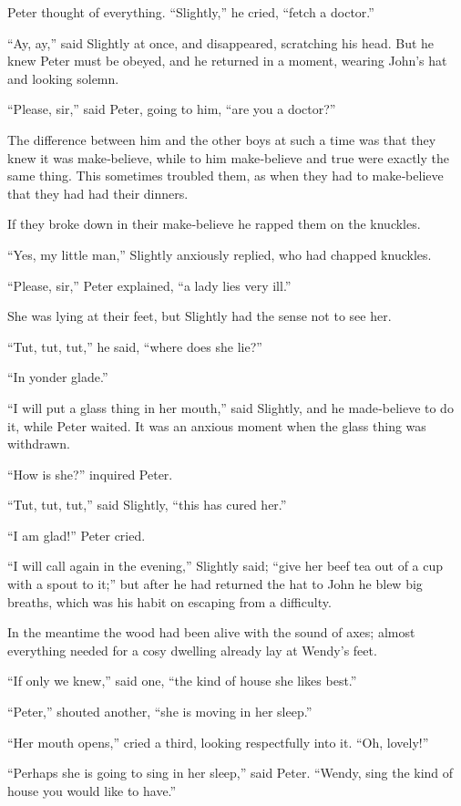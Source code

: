 Peter thought of everything.
“Slightly,” he cried, “fetch a doctor.”

“Ay, ay,” said Slightly at once, and disappeared, scratching his head.
But he knew Peter must be obeyed, and he returned in a moment, wearing John’s hat and looking solemn.

“Please, sir,” said Peter, going to him, “are you a doctor?”

The difference between him and the other boys at such a time was that they knew it was make‐believe,
while to him make‐believe and true were exactly the same thing.
This sometimes troubled them, as when they had to make‐believe that they had had their dinners.

If they broke down in their make‐believe he rapped them on the knuckles.

“Yes, my little man,” Slightly anxiously replied, who had chapped knuckles.

“Please, sir,” Peter explained, “a lady lies very ill.”

She was lying at their feet, but Slightly had the sense not to see her.

“Tut, tut, tut,” he said, “where does she lie?”

“In yonder glade.”

“I will put a glass thing in her mouth,” said Slightly,
and he made‐believe to do it, while Peter waited.
It was an anxious moment when the glass thing was withdrawn.

“How is she?\@” inquired Peter.

“Tut, tut, tut,” said Slightly, “this has cured her.”

“I am glad!\@” Peter cried.

“I will call again in the evening,” Slightly said;
“give her beef tea out of a cup with a spout to it;”
but after he had returned the hat to John he blew big breaths,
which was his habit on escaping from a difficulty.

In the meantime the wood had been alive with the sound of axes;
almost everything needed for a cosy dwelling already lay at Wendy’s feet.

“If only we knew,” said one, “the kind of house she likes best.”

“Peter,” shouted another, “she is moving in her sleep.”

“Her mouth opens,” cried a third, looking respectfully into it.
“Oh, lovely!”

“Perhaps she is going to sing in her sleep,” said Peter.
“Wendy, sing the kind of house you would like to have.”

